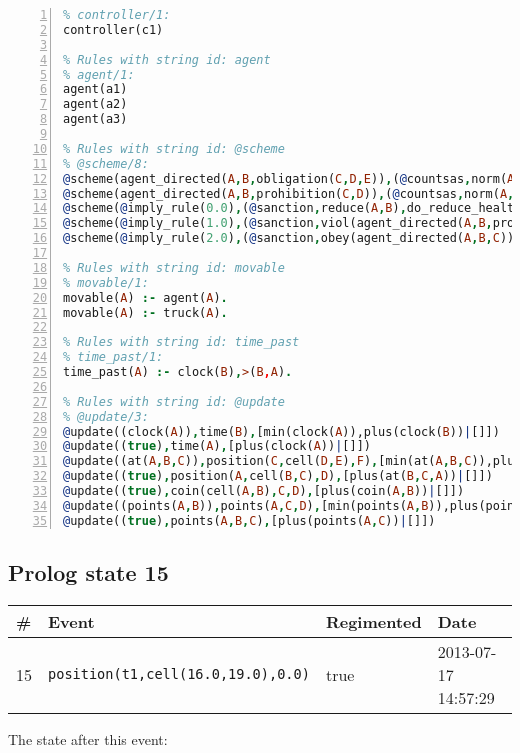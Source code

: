 \documentclass[11pt]{article}\usepackage[utf8]{inputenc}\usepackage{geometry}
\begin{document}
\begin{lstlisting}[language=Prolog, numbers=left]
% Rules with string id: controller
% controller/1:
controller(c1)

% Rules with string id: agent
% agent/1:
agent(a1)
agent(a2)
agent(a3)

% Rules with string id: @scheme
% @scheme/8:
@scheme(agent_directed(A,B,obligation(C,D,E)),(@countsas,norm(A,B,F,obligation(C,D,E)),F),false,(listTrue(C)),(time_past(D)),false,[plus(viol(agent_directed(A,B,obligation(C,D,E))))|[]],[plus(obey(agent_directed(A,B,obligation(C,D,E))))|[]])
@scheme(agent_directed(A,B,prohibition(C,D)),(@countsas,norm(A,B,E,prohibition(C,D)),E),(listTrue(C)),false,(false),false,[plus(viol(agent_directed(A,B,prohibition(C,D))))|[]],[plus(obey(agent_directed(A,B,prohibition(C,D))))|[]])
@scheme(@imply_rule(0.0),(@sanction,reduce(A,B),do_reduce_health(A,B),notifyAgent(A,changed(status))),true,false,false,false,[min(reduce(A,B))|[]],[])
@scheme(@imply_rule(1.0),(@sanction,viol(agent_directed(A,B,prohibition(C,D))),do_sanction(D)),true,false,false,false,[min(viol(agent_directed(A,B,prohibition(C,D))))|[]],[])
@scheme(@imply_rule(2.0),(@sanction,obey(agent_directed(A,B,C))),true,false,false,false,[min(obey(agent_directed(A,B,C)))|[]],[])

% Rules with string id: movable
% movable/1:
movable(A) :- agent(A).
movable(A) :- truck(A).

% Rules with string id: time_past
% time_past/1:
time_past(A) :- clock(B),>(B,A).

% Rules with string id: @update
% @update/3:
@update((clock(A)),time(B),[min(clock(A)),plus(clock(B))|[]])
@update((true),time(A),[plus(clock(A))|[]])
@update((at(A,B,C)),position(C,cell(D,E),F),[min(at(A,B,C)),plus(at(D,E,C))|[]])
@update((true),position(A,cell(B,C),D),[plus(at(B,C,A))|[]])
@update((true),coin(cell(A,B),C,D),[plus(coin(A,B))|[]])
@update((points(A,B)),points(A,C,D),[min(points(A,B)),plus(points(A,D))|[]])
@update((true),points(A,B,C),[plus(points(A,C))|[]])

\end{lstlisting}
\clearpage 
\subsection{Prolog state 15}
\begin{table}[ht]
\centering 
\begin{tabular}{l l l l} 
\textbf{\#} & \textbf{Event} & \textbf{Regimented} & \textbf{Date} \\ [0.5ex] 
\hline
15&\texttt{position(t1,cell(16.0,19.0),0.0)}&true&2013-07-17 14:57:29\\ [1ex] \hline\end{tabular}
\end{table}
The state after this event:
\end{document}
